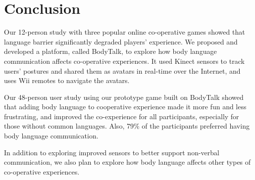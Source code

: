 \chapter{Conclusion}

Our 12-person study with three popular online co-operative games showed that language barrier significantly degraded players' experience. 
We proposed and developed a platform, called BodyTalk, to explore how body language communication affects 
co-operative experiences. It used Kinect sensors to track users’ postures and shared them as avatars in real-time over the Internet, and uses Wii remotes to navigate the avatars. 

Our 48-person user study using our prototype game built on BodyTalk showed that adding body language to cooperative experience made it more fun and less frustrating, and improved the co-experience for all participants, especially for those without common languages. Also, 79\% of the participants preferred having body language communication.

In addition to exploring improved sensors to better support non-verbal communication, we also plan to explore how body language affects other types of co-operative experiences.
